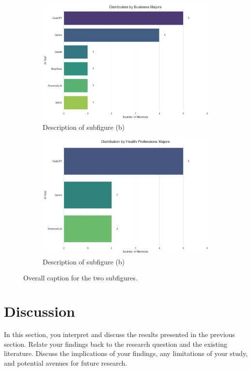 \documentclass[12pt]{article}
\begin{document}
\begin{figure}[htbp]
\begin{subfigure}[b]{0.45\textwidth}
    \includegraphics[width=\textwidth]{fig4-3.png} %
    \caption{Description of subfigure (b)}
    \label{fig:subfig1b}
  \end{subfigure}
  \hfill %
  \begin{subfigure}[b]{0.45\textwidth}
    \includegraphics[width=\textwidth]{fig4-4.png} %
    \caption{Description of subfigure (b)}
    \label{fig:subfig1b}
  \end{subfigure}
  \caption{Overall caption for the two subfigures.}
  \label{fig:subfigures1}
\end{figure}

\section{Discussion}
\label{sec:discussion}
In this section, you interpret and discuss the results presented in the previous section. Relate your findings back to the research question and the existing literature. Discuss the implications of your findings, any limitations of your study, and potential avenues for future research.
\end{document}
